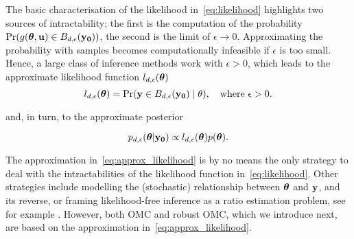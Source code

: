 The basic characterisation of the likelihood in~\eqref{eq:likelihood}
highlights two sources of intractability; the first is the computation
of the probability
\(\Pr(g(\boldsymbol{\theta},\mathbf{u}) \in B_{d,\epsilon}(\mathbf{y_0}))\), the second is the
limit of \(\epsilon \to 0\). Approximating the probability with
samples becomes computationally infeasible if \(\epsilon\) is too
small. Hence, a large class of inference methods work with
\(\epsilon > 0\), which leads to the approximate likelihood function
\(l_{d, \epsilon}(\boldsymbol{\theta})\)
\begin{equation} \label{eq:approx_likelihood}
  l_{d, \epsilon}(\boldsymbol{\theta}) = \Pr(\mathbf{y} \in B_{d,\epsilon}(\mathbf{y_0}) \mid \theta), \quad \text{where  } \epsilon > 0.
\end{equation}

and, in turn, to the approximate posterior

\begin{equation} \label{eq:approx_posterior}
  p_{d,\epsilon}(\boldsymbol{\theta}|\mathbf{y_0}) \propto l_{d, \epsilon}(\boldsymbol{\theta}) p(\boldsymbol{\theta}).
\end{equation}

The approximation in~\eqref{eq:approx_likelihood} is by no means the
only strategy to deal with the intractabilities of the likelihood
function in~\eqref{eq:likelihood}. Other strategies include modelling
the (stochastic) relationship between \(\boldsymbol{\theta}\) and \(\mathbf{y}\), and its
reverse, or framing likelihood-free inference as a ratio estimation
problem, see for example \citet{blum2010, Wood2006, Papamakarios2016,
  Papamakarios2019, Chen2019, Thomas2020, Hermans2020}. However, both
OMC and robust OMC, which we introduce next, are based on the
approximation in~\eqref{eq:approx_likelihood}.

